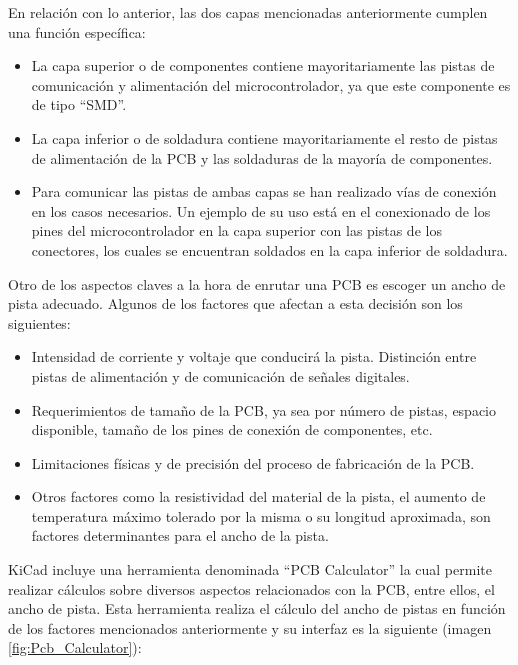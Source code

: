 En relación con lo anterior, las dos capas mencionadas anteriormente cumplen una función específica:
\begin{itemize}
    \item La capa superior o de componentes contiene mayoritariamente las pistas de comunicación y alimentación del microcontrolador, ya que este componente es de tipo ``\ac{SMD}''.
    
    \item La capa inferior o de soldadura contiene mayoritariamente el resto de pistas de alimentación de la \ac{PCB} y las soldaduras de la mayoría de componentes.
    
    \item Para comunicar las pistas de ambas capas se han realizado vías de conexión en los casos necesarios. Un ejemplo de su uso está en el conexionado de los pines del microcontrolador en la capa superior con las pistas de los conectores, los cuales se encuentran soldados en la capa inferior de soldadura.
\end{itemize}

Otro de los aspectos claves a la hora de enrutar una \ac{PCB} es escoger un ancho de pista adecuado. Algunos de los factores que afectan a esta decisión son los siguientes:
\begin{itemize}
    \item Intensidad de corriente y voltaje que conducirá la pista. Distinción entre pistas de alimentación y de comunicación de señales digitales.
    \item Requerimientos de tamaño de la \ac{PCB}, ya sea por número de pistas, espacio disponible, tamaño de los pines de conexión de componentes, etc.
    \item Limitaciones físicas y de precisión del proceso de fabricación de la \ac{PCB}.
    \item Otros factores como la resistividad del material de la pista, el aumento de temperatura máximo tolerado por la misma o su longitud aproximada, son factores determinantes para el ancho de la pista.
\end{itemize}

KiCad incluye una herramienta denominada ``\ac{PCB} Calculator'' la cual permite realizar cálculos sobre diversos aspectos relacionados con la \ac{PCB}, entre ellos, el ancho de pista. Esta herramienta realiza el cálculo del ancho de pistas en función de los factores mencionados anteriormente y su interfaz es la siguiente (imagen \ref{fig:Pcb_Calculator}):

